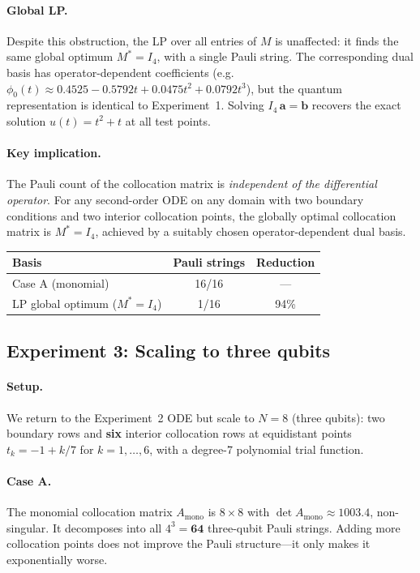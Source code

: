\documentclass[a4paper,12pt]{amsart}
\begin{document}
\paragraph{Global LP.}
Despite this obstruction, the LP over all entries of $M$ is unaffected: it finds the same global optimum $M^* = I_4$, with a single Pauli string. The corresponding dual basis has operator-dependent coefficients (e.g.\ $\phi_0(t) \approx 0.4525 - 0.5792t + 0.0475t^2 + 0.0792t^3$), but the quantum representation is identical to Experiment~1. Solving $I_4\,\mathbf{a}=\mathbf{b}$ recovers the exact solution $u(t)=t^2+t$ at all test points.

\paragraph{Key implication.}
The Pauli count of the collocation matrix is \emph{independent of the differential operator}. For any second-order ODE on any domain with two boundary conditions and two interior collocation points, the globally optimal collocation matrix is $M^*=I_4$, achieved by a suitably chosen operator-dependent dual basis.

\begin{center}
\begin{tabular}{lcc}
\hline
Basis & Pauli strings & Reduction \\
\hline
Case A (monomial)             & 16/16 & --- \\
LP global optimum ($M^*=I_4$) &  1/16 & 94\% \\
\hline
\end{tabular}
\end{center}

\subsection{Experiment 3: Scaling to three qubits}

\paragraph{Setup.}
We return to the Experiment~2 ODE but scale to $N=8$ (three qubits): two boundary rows and \textbf{six} interior collocation rows at equidistant points $t_k = -1 + k/7$ for $k=1,\ldots,6$, with a degree-7 polynomial trial function.

\paragraph{Case A.}
The monomial collocation matrix $A_{\mathrm{mono}}$ is $8\times 8$ with $\det A_{\mathrm{mono}} \approx 1003.4$, non-singular. It decomposes into all $4^3 = \mathbf{64}$ three-qubit Pauli strings. Adding more collocation points does not improve the Pauli structure---it only makes it exponentially worse.
\end{document}
